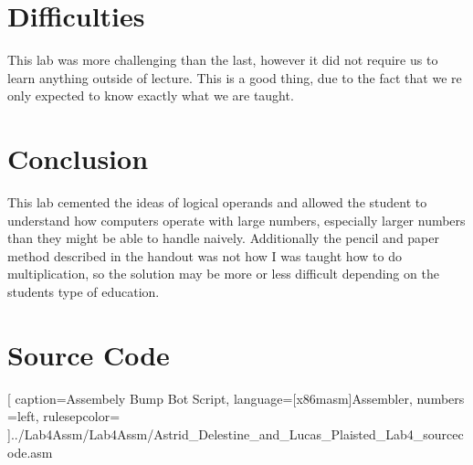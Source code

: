 \documentclass[12pt,letterpaper]{article}
\begin{document}
\section{Difficulties}
This lab was more challenging than the last, however it did not require us to learn anything outside of lecture. This is a good thing, due to the fact that we re only expected to know exactly what we are taught.

\section{Conclusion}
This lab cemented the ideas of logical operands and allowed the student to understand how computers operate with large numbers, especially larger numbers than they might be able to handle naively. Additionally the pencil and paper method described in the handout was not how I was taught how to do multiplication, so the solution may be more or less difficult depending on the students type of education.

\pagebreak

\section{Source Code}%

[
caption=Assembely Bump Bot Script,
language={[x86masm]Assembler},
numbers =left,
rulesepcolor=\color{blue}
]{../Lab4Assm/Lab4Assm/Astrid_Delestine_and_Lucas_Plaisted_Lab4_sourcecode.asm}
\end{document}
